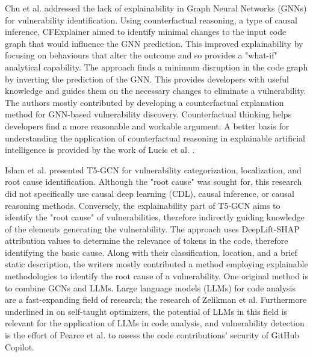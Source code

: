 \documentclass{buthesis}
\begin{document}
Chu et al. \cite{Chu2024ISSTA} addressed the lack of explainability in Graph Neural Networks (GNNs) for vulnerability identification. Using counterfactual reasoning, a type of causal inference, CFExplainer aimed to identify minimal changes to the input code graph that would influence the GNN prediction. This improved explainability by focusing on behaviours that alter the outcome and so provides a "what-if" analytical capability. The approach finds a minimum disruption in the code graph by inverting the prediction of the GNN. This provides developers with useful knowledge and guides them on the necessary changes to eliminate a vulnerability. The authors mostly contributed by developing a counterfactual explanation method for GNN-based vulnerability discovery. Counterfactual thinking helps developers find a more reasonable and workable argument. A better basis for understanding the application of counterfactual reasoning in explainable artificial intelligence is provided by the work of Lucic et al. \cite{lucic2022cf}.

Islam et al. \cite{Islam2024} presented T5-GCN for vulnerability categorization, localization, and root cause identification. Although the "root cause" was sought for, this research did not specifically use causal deep learning (CDL), causal inference, or causal reasoning methods. Conversely, the explainability part of T5-GCN aims to identify the "root cause" of vulnerabilities, therefore indirectly guiding knowledge of the elements generating the vulnerability. The approach uses DeepLift-SHAP attribution values to determine the relevance of tokens in the code, therefore identifying the basic cause. Along with their classification, location, and a brief static description, the writers mostly contributed a method employing explainable methodologies to identify the root cause of a vulnerability. One original method is to combine GCNs and LLMs. Large language models (LLMs) for code analysis are a fast-expanding field of research; the research of Zelikman et al. Furthermore underlined in \cite{Zelikman2023} on self-taught optimizers, the potential of LLMs in this field is relevant for the application of LLMs in code analysis, and vulnerability detection is the effort of Pearce et al. \cite{pearce2025asleep} to assess the code contributions' security of GitHub Copilot.
\end{document}
